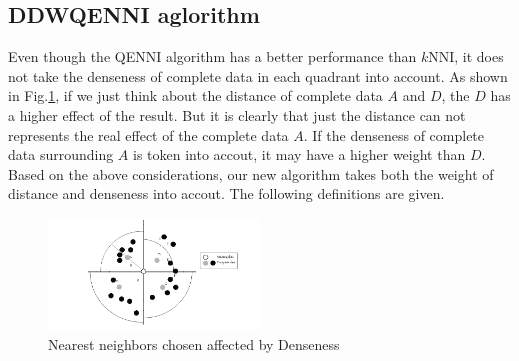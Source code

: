 \documentclass[print]{jicspack}
\begin{document}
\subsection{DDWQENNI aglorithm}
\label{2.4}
Even though the QENNI algorithm has a better performance than $k$NNI, it does not take the denseness of complete data in each quadrant into account. As shown in Fig.\ref{fig:figure3}, if we just think about the distance of complete data $A$ and $D$, the $D$ has a higher effect of the result. But it is clearly that just the distance can not represents the real effect of the complete data $A$. If the denseness of complete data surrounding $A$ is token into accout, it may have a higher weight than $D$. Based on the above considerations, our new algorithm takes both the weight of distance and denseness into accout. The following definitions are given.
\begin{figure}[h]
\centering
\includegraphics[angle=0, width=0.5\textwidth]{figure3.png}
\caption{Nearest neighbors chosen affected by Denseness}
\label{fig:figure3}
\end{figure}
\end{document}
